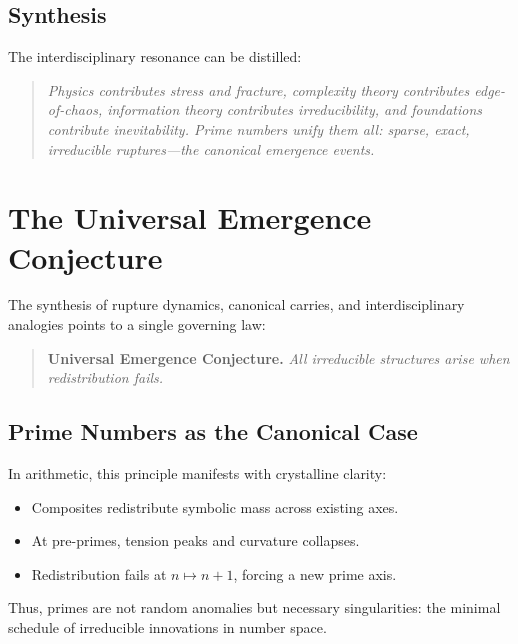 \documentclass[11pt]{article}
\theoremstyle{plain}
\theoremstyle{definition}
\begin{document}
\subsection{Synthesis}
The interdisciplinary resonance can be distilled:
\begin{quote}
\emph{Physics contributes stress and fracture, complexity theory contributes edge-of-chaos, information theory contributes irreducibility, and foundations contribute inevitability.  
Prime numbers unify them all: sparse, exact, irreducible ruptures—the canonical emergence events.}
\end{quote}

\section{The Universal Emergence Conjecture}

The synthesis of rupture dynamics, canonical carries, and interdisciplinary analogies points to a single governing law:

\begin{quote}
\textbf{Universal Emergence Conjecture.}  
\emph{All irreducible structures arise when redistribution fails.}
\end{quote}

\subsection{Prime Numbers as the Canonical Case}
In arithmetic, this principle manifests with crystalline clarity:
\begin{itemize}
  \item Composites redistribute symbolic mass across existing axes.  
  \item At pre-primes, tension peaks and curvature collapses.  
  \item Redistribution fails at $n \mapsto n+1$, forcing a new prime axis.  
\end{itemize}
Thus, primes are not random anomalies but necessary singularities: the minimal schedule of irreducible innovations in number space.
\end{document}

